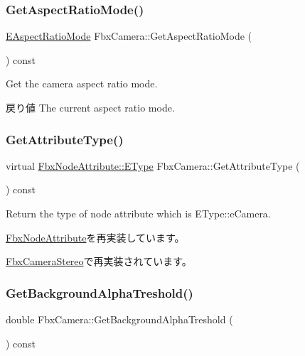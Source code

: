 \subsubsection{\texorpdfstring{Get\+Aspect\+Ratio\+Mode()}{GetAspectRatioMode()}}
{\footnotesize\ttfamily \hyperlink{class_fbx_camera_a2135478bb5fd6985835c14b11e1fccda}{E\+Aspect\+Ratio\+Mode} Fbx\+Camera\+::\+Get\+Aspect\+Ratio\+Mode (\begin{DoxyParamCaption}{ }\end{DoxyParamCaption}) const}

Get the camera aspect ratio mode. \begin{DoxyReturn}{戻り値}
The current aspect ratio mode. 
\end{DoxyReturn}
\mbox{\label{class_fbx_camera_a1149e4b05fd079637fe8d2a66a5a7a17}} 
\subsubsection{\texorpdfstring{Get\+Attribute\+Type()}{GetAttributeType()}}
{\footnotesize\ttfamily virtual \hyperlink{class_fbx_node_attribute_a08e1669d3d1a696910756ab17de56d6a}{Fbx\+Node\+Attribute\+::\+E\+Type} Fbx\+Camera\+::\+Get\+Attribute\+Type (\begin{DoxyParamCaption}{ }\end{DoxyParamCaption}) const\hspace{0.3cm}{\ttfamily [virtual]}}



Return the type of node attribute which is E\+Type\+::e\+Camera. 



\hyperlink{class_fbx_node_attribute_a1c2116756906127145a2b8721fc26752}{Fbx\+Node\+Attribute}を再実装しています。



\hyperlink{class_fbx_camera_stereo_a19160f0fdeaf5407d2bc9c1608f6af53}{Fbx\+Camera\+Stereo}で再実装されています。

\mbox{\label{class_fbx_camera_ad8dd3ac058eae9dab18e43896fbda3ad}} 
\subsubsection{\texorpdfstring{Get\+Background\+Alpha\+Treshold()}{GetBackgroundAlphaTreshold()}}
{\footnotesize\ttfamily double Fbx\+Camera\+::\+Get\+Background\+Alpha\+Treshold (\begin{DoxyParamCaption}{ }\end{DoxyParamCaption}) const}


